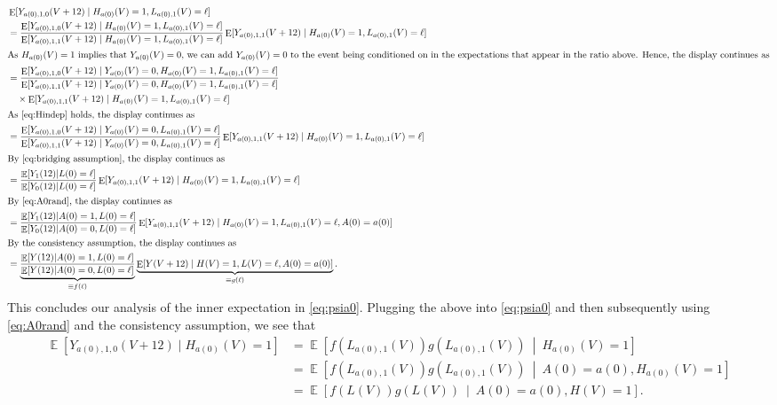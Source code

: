 \documentclass[12pt]{article}
\theoremstyle{definition}
\DeclareMathOperator{\E}{E}
\DeclareMathOperator{\cE}{\mathbb{E}}
\newcommand{\Hopen}{V}
\begin{document}
\begin{align*}
    &\E[Y_{a(0),1,0}(\Hopen+12) \mid H_{a(0)}(\Hopen)=1, L_{a(0),1}(\Hopen)=\ell] \\
    &= \frac{\E[Y_{a(0),1,0}(\Hopen+12) \mid H_{a(0)}(\Hopen)=1,  L_{a(0),1}(\Hopen)=\ell]}{\E[Y_{a(0),1,1}(\Hopen+12) \mid H_{a(0)}(\Hopen)=1,  L_{a(0),1}(\Hopen)=\ell]} \E[Y_{a(0),1,1}(\Hopen+12) \mid H_{a(0)}(\Hopen)=1,  L_{a(0),1}(\Hopen)=\ell] \\
    \intertext{As $H_{a(0)}(V)=1$ implies that $Y_{a(0)}(V)=0$, we can add $Y_{a(0)}(V)=0$ to the event being conditioned on in the expectations that appear in the ratio above. Hence, the display continues as}
    &= \frac{\E[Y_{a(0),1,0}(\Hopen+12) \mid Y_{a(0)}(\Hopen)=0, H_{a(0)}(\Hopen)=1,  L_{a(0),1}(\Hopen)=\ell]}{\E[Y_{a(0),1,1}(\Hopen+12) \mid Y_{a(0)}(\Hopen)=0, H_{a(0)}(\Hopen)=1, L_{a(0),1}(\Hopen)=\ell]} \\
    &\quad \times \E[Y_{a(0),1,1}(\Hopen+12) \mid H_{a(0)}(\Hopen)=1, L_{a(0),1}(\Hopen)=\ell] \\
    \intertext{As \eqref{eq:Hindep} holds, the display continues as}
    &= \frac{\E[Y_{a(0),1,0}(\Hopen+12) \mid Y_{a(0)}(\Hopen)=0, L_{a(0),1}(\Hopen)=\ell]}{\E[Y_{a(0),1,1}(\Hopen+12) \mid Y_{a(0)}(\Hopen)=0, L_{a(0),1}(\Hopen)=\ell]}\E[Y_{a(0),1,1}(\Hopen+12) \mid H_{a(0)}(\Hopen)=1, L_{a(0),1}(\Hopen)=\ell] \\
    \intertext{By \eqref{eq:bridging assumption}, the display continues as}
    &= \frac{\cE[Y_{1}(12)|L(0)=\ell]}{\cE[Y_{0}(12)|L(0)=\ell]}  \E[Y_{a(0),1,1}(\Hopen+12) \mid H_{a(0)}(\Hopen)=1, L_{a(0),1}(\Hopen)=\ell] \\
    \intertext{By \eqref{eq:A0rand}, the display continues as}
    &= \frac{\cE[Y_{1}(12)|A(0)=1,L(0)=\ell]}{\cE[Y_{0}(12)|A(0)=0,L(0)=\ell]}  \E[Y_{a(0),1,1}(\Hopen+12) \mid H_{a(0)}(\Hopen)=1, L_{a(0),1}(\Hopen)=\ell,A(0)=a(0)] \\
    \intertext{By the consistency assumption, the display continues as}
    &= \underbrace{\frac{\cE[Y(12)|A(0)=1,L(0)=\ell]}{\cE[Y(12)|A(0)=0,L(0)=\ell]}}_{\equiv f(\ell)}  \underbrace{\E[Y(\Hopen+12) \mid H(\Hopen)=1, L(\Hopen)=\ell,A(0)=a(0)]}_{\equiv g(\ell)}.
\end{align*}
This concludes our analysis of the inner expectation in \eqref{eq:psia0}. Plugging the above into \eqref{eq:psia0} and then subsequently using \eqref{eq:A0rand} and the consistency assumption, we see that
\begin{align*}
    \cE[Y_{a(0),1,0}(\Hopen+12)\mid H_{a(0)}(\Hopen)=1]&= \cE\left[f(L_{a(0),1}(\Hopen)) g(L_{a(0),1}(\Hopen))\ \middle|\  H_{a(0)}(\Hopen)=1\right] \\
    &= \cE\left[f(L_{a(0),1}(\Hopen)) g(L_{a(0),1}(\Hopen))\ \middle|\  A(0)=a(0),H_{a(0)}(\Hopen)=1\right] \\
    &= \cE\left[f(L(\Hopen)) g(L(\Hopen))\ \middle|\  A(0)=a(0),H(\Hopen)=1\right].
\end{align*}
\end{document}
